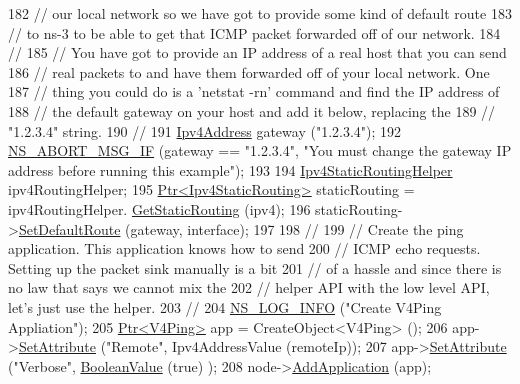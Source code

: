 \begin{DoxyCode}
182   \textcolor{comment}{// our local network so we have got to provide some kind of default route}
183   \textcolor{comment}{// to ns-3 to be able to get that ICMP packet forwarded off of our network.}
184   \textcolor{comment}{//}
185   \textcolor{comment}{// You have got to provide an IP address of a real host that you can send}
186   \textcolor{comment}{// real packets to and have them forwarded off of your local network.  One}
187   \textcolor{comment}{// thing you could do is a 'netstat -rn' command and find the IP address of}
188   \textcolor{comment}{// the default gateway on your host and add it below, replacing the}
189   \textcolor{comment}{// "1.2.3.4" string.}
190   \textcolor{comment}{//}
191   \hyperlink{classns3_1_1Ipv4Address}{Ipv4Address} gateway (\textcolor{stringliteral}{"1.2.3.4"});
192   \hyperlink{group__fatal_ga6653324225bc139e46deea177614ceee}{NS\_ABORT\_MSG\_IF} (gateway == \textcolor{stringliteral}{"1.2.3.4"}, \textcolor{stringliteral}{"You must change the gateway IP address before
       running this example"});
193 
194   \hyperlink{classns3_1_1Ipv4StaticRoutingHelper}{Ipv4StaticRoutingHelper} ipv4RoutingHelper;
195   \hyperlink{classns3_1_1Ptr}{Ptr<Ipv4StaticRouting>} staticRouting = ipv4RoutingHelper.
      \hyperlink{classns3_1_1Ipv4StaticRoutingHelper_a731206e50d305695dac7fb2ef963a4bb}{GetStaticRouting} (ipv4);
196   staticRouting->\hyperlink{classns3_1_1Ipv4StaticRouting_aee30fa3246c2b42f122dabdff2725331}{SetDefaultRoute} (gateway, interface);
197 
198   \textcolor{comment}{//}
199   \textcolor{comment}{// Create the ping application.  This application knows how to send}
200   \textcolor{comment}{// ICMP echo requests.  Setting up the packet sink manually is a bit}
201   \textcolor{comment}{// of a hassle and since there is no law that says we cannot mix the}
202   \textcolor{comment}{// helper API with the low level API, let's just use the helper.}
203   \textcolor{comment}{//}
204   \hyperlink{group__logging_gafbd73ee2cf9f26b319f49086d8e860fb}{NS\_LOG\_INFO} (\textcolor{stringliteral}{"Create V4Ping Appliation"});
205   \hyperlink{classns3_1_1Ptr}{Ptr<V4Ping>} app = CreateObject<V4Ping> ();
206   app->\hyperlink{classns3_1_1ObjectBase_ac60245d3ea4123bbc9b1d391f1f6592f}{SetAttribute} (\textcolor{stringliteral}{"Remote"}, Ipv4AddressValue (remoteIp));
207   app->\hyperlink{classns3_1_1ObjectBase_ac60245d3ea4123bbc9b1d391f1f6592f}{SetAttribute} (\textcolor{stringliteral}{"Verbose"}, \hyperlink{classns3_1_1BooleanValue}{BooleanValue} (\textcolor{keyword}{true}) );
208   node->\hyperlink{classns3_1_1Node_ab98b4fdc4aadc86366b80e8a79a53f47}{AddApplication} (app);

\end{DoxyCode}
